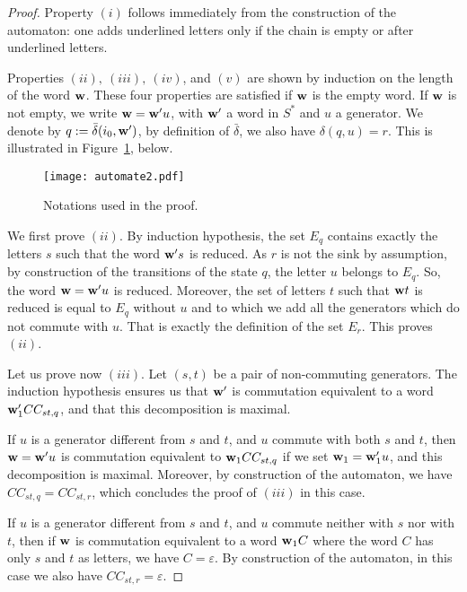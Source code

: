 \documentclass[reqno,12pt]{amsart}
\theoremstyle{definition}
\begin{document}
\begin{proof}


 
Property $(i)$ follows immediately from the construction of the automaton: one adds underlined letters only if the chain is empty or after underlined letters.
 
Properties  $(ii),~(iii),~(iv)$, and $(v)$ are shown by induction on the length of the word ${\bf w}$. These four properties are satisfied if  ${\bf w}$ is the empty word. If $\bf w$ is not empty, we write ${\bf w}={\bf w}'u$, with ${\bf w}'$ a word in $S^*$ and $u$ a generator. We denote by $q:= \bar{\delta}(i_0, {\bf w}')$, by definition of $\bar{\delta}$, we also have $\delta(q,u)=r$. This is illustrated in Figure~\ref{figauto2}, below.

\begin{figure}[!h]
\texttt{[image: automate2.pdf]}
\caption{\label{figauto2}Notations used in the proof.}
\end{figure}

We first prove $(ii)$. By induction hypothesis, the set $E_q$ contains exactly the letters $s$ such that  the word  ${\bf w}'s$ is reduced.  As  $r$ is not the sink by assumption, by construction of the transitions of the state $q$, the letter $u$ belongs to $E_q$. So, the word ${\bf w}={\bf w}'u$ is reduced. Moreover, the set of letters   $t$ such that ${\bf w}t$ is reduced is equal to  $E_q$ without $u$ and to which we add all the generators which do not commute with $u$. That is exactly the definition of the set $E_r$. This proves $(ii)$.

\medskip

Let us prove now $(iii)$. Let $(s,t)$ be a pair of non-commuting generators. The induction hypothesis ensures us that  ${\bf w}'$ is commutation equivalent to a word ${\bf w}_1'CC_{st,q}$, and that this decomposition is maximal. 

If $u$ is a generator different from $s$ and $t$, and $u$ commute with both $s$ and $t$, then ${\bf w}={\bf w}'u$ is commutation equivalent to ${\bf w}_1CC_{st,q}$ if we set ${\bf w}_1={\bf w}_1'u$, and this decomposition is maximal. Moreover, by construction of the automaton, we have $CC_{st,q}=CC_{st,r}$, which concludes the proof of $(iii)$ in this case.
 
 If  $u$ is a generator different from $s$ and $t$, and  $u$ commute neither with $s$ nor with $t$, then if  ${\bf w}$ is commutation equivalent to a word $ {\bf w}_1C$ where the word $C$ has only  $s$ and $t$ as letters, we have $C= \varepsilon$. By construction of the automaton, in this case we also have $CC_{st,r}= \varepsilon$.
 

\end{proof}
\end{document}

